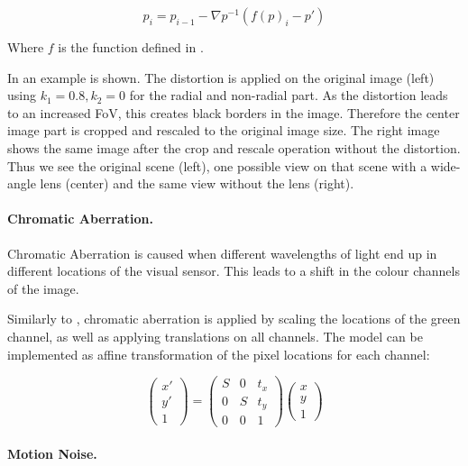 \begin{equation}
	p_i = p_{i-1} - \nabla p^{-1} (f(p)_i-p')
\end{equation}

Where $f$ is the function defined in . 

In  an example is shown. The distortion is applied on the original image (left) using $k_1=0.8, k_2=0$ for the radial and non-radial part. As the distortion leads to an increased \ac{FoV}, this creates black borders in the image. Therefore the center image part is cropped and rescaled to the original image size. The right image shows the same image after the crop and rescale operation without the distortion. Thus we see the original scene (left), one possible view on that scene with a wide-angle lens (center) and the same view without the lens (right). 



\paragraph{Chromatic Aberration.}

Chromatic Aberration is caused when different wavelengths of light end up in different locations of the visual sensor. This leads to a shift in the colour channels of the image.

Similarly to \cite{Carlson2018}, chromatic aberration is applied by scaling the locations of the green channel, as well as applying translations on all channels. The model can be implemented as affine transformation of the pixel locations for each channel:

\begin{equation}
\begin{pmatrix}
x' \\
y' \\
1
\end{pmatrix} = \begin{pmatrix}
S & 0 & t_x \\
0 & S & t_y \\
0 & 0 & 1
\end{pmatrix} \begin{pmatrix}
x \\
y \\
1
\end{pmatrix}
\end{equation}

\paragraph{Motion Noise.}

